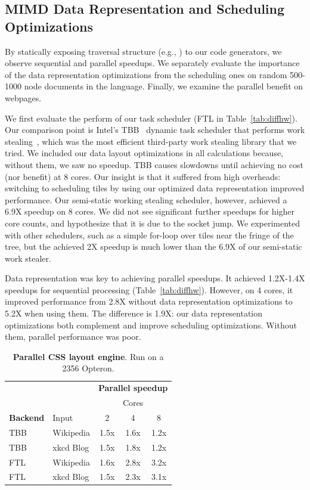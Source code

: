 \subsection{MIMD Data Representation and Scheduling Optimizations}
By statically exposing traversal structure (e.g., ) to our code generators, we observe sequential and parallel speedups. We separately evaluate the importance of the data representation optimizations from the scheduling ones on random 500-1000 node documents in the \hlangpp{} language. Finally, we examine the parallel benefit on webpages.


We first evaluate the perform of our task scheduler (FTL in Table~\ref{tab:diffhw}).  Our comparison point is Intel's TBB~\cite{inteltbb} dynamic task scheduler that performs work stealing~\cite{cilk}, which was the most efficient third-party work stealing library that we tried. We included our data layout optimizations in all calculations because, without them, we saw no speedup.  TBB causes slowdowns until achieving no cost (nor benefit) at 8 cores. Our insight is that it suffered from high overheads: switching to scheduling tiles by using our optimized data representation improved performance. Our semi-static working stealing scheduler, however, achieved a 6.9X speedup on 8 cores. We did not see significant further speedups for higher core counts, and hypothesize that it is due to the socket jump. We experimented with other schedulers, such as a simple for-loop over tiles near the fringe of the tree, but the achieved 2X speedup is much lower than the 6.9X of our semi-static work stealer.


Data representation was key to achieving parallel speedups. It achieved 1.2X-1.4X speedups for sequential processing (Table~\ref{tab:diffhw}). However, on 4 cores, it improved performance from 2.8X without data representation optimizations to 5.2X when using them. The difference is 1.9X: our data representation optimizations both complement and improve scheduling optimizations. Without them, parallel performance was poor.

\begin{table}[t]
\center
\begin{tabular}{l|l| c | c | c}
~ & & \multicolumn{3}{c}{\textbf{Parallel speedup}}\\
~ & & \multicolumn{3}{c}{Cores}\\
\textbf{Backend} & Input & 2 & 4 & 8\\ [0.5ex] \hline \hline
TBB & {Wikipedia} &  1.5x & 1.6x & 1.2x \\
TBB & {xkcd Blog} &  1.5x & 1.8x & 1.2x \\ \hline
FTL & {Wikipedia} &  1.6x & 2.8x & 3.2x \\
FTL & {xkcd Blog} &  1.5x & 2.3x & 3.1x \\ 
\end{tabular}
\caption{\textbf{Parallel CSS layout engine}. Run on a 2356 Opteron.}
\label{fig:cssperf}
\end{table}

